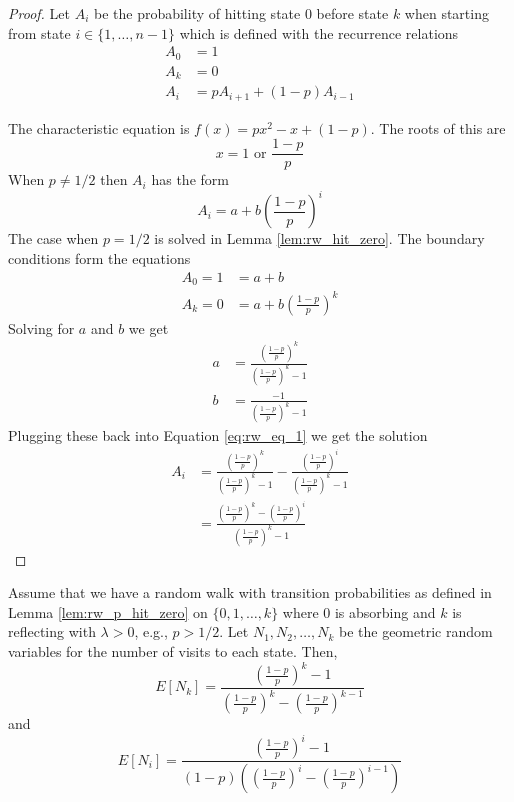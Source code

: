 \begin{proof}
Let $A_i$ be the probability of hitting state 0 before state $k$ when starting from state $i \in \{1,\ldots, n - 1\}$ which is defined with the recurrence relations
\begin{align*}
    A_0 &= 1\\
    A_{k} &= 0\\
    A_i &= p A_{i + 1} + (1 - p) A_{i - 1}
\end{align*}

The characteristic equation is $f(x) = p x^2 - x + (1 - p)$.
The roots of this are
$$
x = 1 \text{ or } \frac{1 - p}{p}
$$
When $p \not = 1/2$ then $A_i$ has the form
\begin{equation}\label{eq:rw_eq_1}
    A_i = a + b \left( \frac{1 - p}{p} \right)^i
\end{equation}
The case when $p = 1/2$ is solved in Lemma \ref{lem:rw_hit_zero}.
The boundary conditions form the equations
\begin{align*}
    A_0 = 1 &= a + b\\
    A_k = 0 &= a + b  \left( \frac{1 - p}{p} \right)^{k}
\end{align*}
Solving for $a$ and $b$ we get
\begin{align*}
    a &= \frac{\left( \frac{1 - p}{p} \right)^{k}}{\left( \frac{1 - p}{p} \right)^{k} - 1}\\
    b &= \frac{-1}{\left( \frac{1 - p}{p} \right)^{k} - 1}
\end{align*}
Plugging these back into Equation \ref{eq:rw_eq_1} we get the solution
\begin{align*}
    A_i &= \frac{
        \left( \frac{1 - p}{p} \right)^{k}
    }{
        \left( \frac{1 - p}{p} \right)^{k} - 1
    } -
    \frac{
        \left( \frac{1 - p}{p} \right)^{i}
    }{
        \left( \frac{1 - p}{p} \right)^{k} - 1
    }\\
    &= \frac{
        \left( \frac{1 - p}{p} \right)^{k} - \left( \frac{1 - p}{p} \right)^{i}
    }{
         \left( \frac{1 - p}{p} \right)^{k} - 1
    }
\end{align*}
\end{proof}

\begin{theorem}\label{thm:expected_visits_rw_p}
Assume that we have a random walk with transition probabilities as defined in Lemma \ref{lem:rw_p_hit_zero} on $\{0,1,\ldots, k\}$ where 0 is absorbing and $k$ is reflecting with $\lambda > 0$, e.g., $p > 1/2$.
Let $N_1, N_2, \ldots, N_k$ be the geometric random variables for the number of visits to each state.
Then,
$$
E[N_k] = \frac{
        \left( \frac{1 - p}{p} \right)^{k} - 1
    }{
        \left( \frac{1 - p}{p} \right)^{k} - \left( \frac{1 - p}{p} \right)^{k - 1}
    }
$$
and
$$
E[N_i] = \frac{
        \left( \frac{1 - p}{p} \right)^{i} - 1
    }{
        (1 - p) \left( \left( \frac{1 - p}{p} \right)^{i} - \left( \frac{1 - p}{p} \right)^{i - 1}\right)
    }
$$
\end{theorem}

